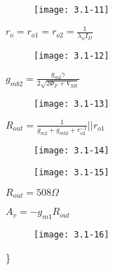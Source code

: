 {	\begin{figure}[H] %
		\begin{minipage}{\linewidth}
			\texttt{[image: 3.1-11]}
		\end{minipage}
	\end{figure}
	
	$r_o=r_{o1}=r_{o2}=\frac{1}{\lambda_n I_D}$
	
	\begin{figure}[H] %
		\begin{minipage}{\linewidth}
			\texttt{[image: 3.1-12]}
		\end{minipage}
	\end{figure}
	
	$g_{mb2}=\frac{g_{m2}\gamma}{2\sqrt{2\Phi_F+V_{SB}}}$
	
	\begin{figure}[H] %
		\begin{minipage}{\linewidth}
			\texttt{[image: 3.1-13]}
		\end{minipage}
	\end{figure}
	
	$R_{out}=\frac{1}{g_{m2}+g_{mb2}+r_{o2}^{-1}}||r_{o1}$
	
	\begin{figure}[H] %
		\begin{minipage}{\linewidth}
			\texttt{[image: 3.1-14]}
		\end{minipage}
	\end{figure}
	
	\begin{figure}[H] %
		\begin{minipage}{\linewidth}
			\texttt{[image: 3.1-15]}
		\end{minipage}
	\end{figure}
	
	$R_{out}=508\Omega$
	
	$A_v=-g_{m1}R_{out}$
	
	\begin{figure}[H] %
		\begin{minipage}{\linewidth}
			\texttt{[image: 3.1-16]}
		\end{minipage}
	\end{figure}
	
	
	
	
	
	
	
	\}
	
	
	
	
	
	
}









\color{black}{
	
}